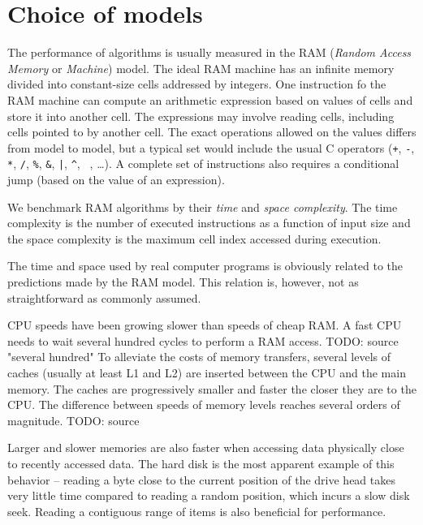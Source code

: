 \chapter{Choice of models}

The performance of algorithms is usually measured in the RAM
(\textit{Random Access Memory} or \textit{Machine}) model.
The ideal RAM machine has an infinite memory divided into constant-size
cells addressed by integers.
One instruction fo the RAM machine can compute an arithmetic expression
based on values of cells and store it into another cell. The expressions
may involve reading cells, including cells pointed to by another cell.
The exact operations allowed on the values differs from model to model,
but a typical set would include the usual C operators (\texttt{+}, \texttt{-},
\texttt{*}, \texttt{/}, \texttt{\%}, \texttt{\&}, \texttt{|}, \texttt{\^},
\texttt{~}, \dots).
A complete set of instructions also requires a conditional jump (based on
the value of an expression).

We benchmark RAM algorithms by their \textit{time} and \textit{space complexity}.
The time complexity is the number of executed instructions as a function of
input size and the space complexity is the maximum cell index accessed during
execution.

The time and space used by real computer programs is obviously related
to the predictions made by the RAM model. This relation is, however, not
as straightforward as commonly assumed.


CPU speeds have been growing slower than speeds of cheap RAM. A fast CPU
needs to wait several hundred cycles to perform a RAM access. TODO: source "several hundred"
To alleviate the costs of memory transfers, several levels of caches (usually
at least L1 and L2) are inserted between the CPU and the main memory.
The caches are progressively smaller and faster the closer they are to the CPU.
The difference between speeds of memory levels reaches several orders of magnitude. TODO: source

Larger and slower memories are also faster when accessing data physically
close to recently accessed data. The hard disk is the most apparent example
of this behavior -- reading a byte close to the current position of the drive
head takes very little time compared to reading a random position, which incurs
a slow disk seek. %
Reading a contiguous range of items is also beneficial for performance.

